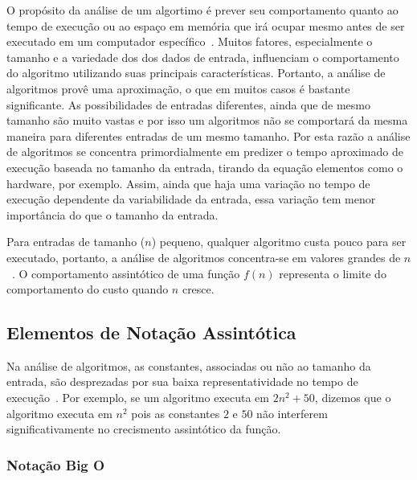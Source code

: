 \documentclass[11pt,fleqn]{book} %
\begin{document}
O propósito da análise de um algortimo é prever seu comportamento quanto ao tempo de execução ou ao espaço em memória que irá ocupar mesmo antes de ser executado em um computador específico~\cite{manber1989}.
Muitos fatores, especialmente o tamanho e a variedade dos dos dados de entrada, influenciam o comportamento do algoritmo utilizando suas principais características.
Portanto, a análise de algoritmos provê uma aproximação, o que em muitos casos é bastante significante.
As possibilidades de entradas diferentes, ainda que de mesmo tamanho são muito vastas e por isso um algoritmos não se comportará da mesma maneira para diferentes entradas de um mesmo tamanho. 
Por esta razão a análise de algoritmos se concentra primordialmente em predizer o tempo aproximado de execução baseada no tamanho da entrada, tirando da equação elementos como o hardware, por exemplo.
Assim, ainda que haja uma variação no tempo de execução dependente da variabilidade da entrada, essa variação tem menor importância do que o tamanho da entrada.

Para entradas de tamanho ($n$) pequeno, qualquer algoritmo custa pouco para ser executado, portanto, a análise de algoritmos concentra-se em valores grandes de $n$~\cite{ziviani2007}.
O comportamento assintótico de uma função $f(n)$ representa o limite do comportamento do custo quando $n$ cresce.

\subsection{Elementos de Notação Assintótica}
Na análise de algoritmos, as constantes, associadas ou não ao tamanho da entrada, são desprezadas por sua baixa representatividade no tempo de execução~\cite{manber1989}.
Por exemplo, se um algoritmo executa em $2n^2+50$, dizemos que o algoritmo executa em $n^2$ pois as constantes $2$ e $50$ não interferem significativamente no crecismento assintótico da função.

\subsubsection{Notação Big O}
\end{document}
